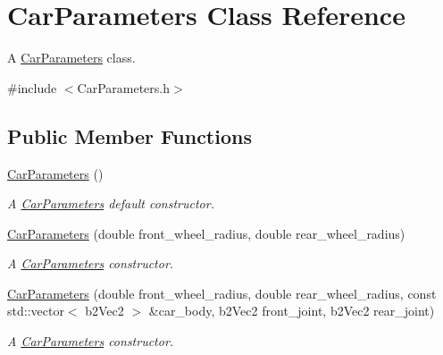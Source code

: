 \hypertarget{classCarParameters}{}\section{Car\+Parameters Class Reference}
\label{classCarParameters}


A \hyperlink{classCarParameters}{Car\+Parameters} class.  




{\ttfamily \#include $<$Car\+Parameters.\+h$>$}

\subsection*{Public Member Functions}
\begin{DoxyCompactItemize}
\item 
\hyperlink{classCarParameters_a188ab05105e5d379744f2fec14d51650}{Car\+Parameters} ()
\begin{DoxyCompactList}\small\item\em A \hyperlink{classCarParameters}{Car\+Parameters} default constructor. \end{DoxyCompactList}\item 
\hyperlink{classCarParameters_a6e3073a201221f3fa524eafb6d0e793d}{Car\+Parameters} (double front\+\_\+wheel\+\_\+radius, double rear\+\_\+wheel\+\_\+radius)
\begin{DoxyCompactList}\small\item\em A \hyperlink{classCarParameters}{Car\+Parameters} constructor. \end{DoxyCompactList}\item 
\hyperlink{classCarParameters_ae6c1ad622bffec4176ef45456e8aaacc}{Car\+Parameters} (double front\+\_\+wheel\+\_\+radius, double rear\+\_\+wheel\+\_\+radius, const std\+::vector$<$ b2\+Vec2 $>$ \&car\+\_\+body, b2\+Vec2 front\+\_\+joint, b2\+Vec2 rear\+\_\+joint)
\begin{DoxyCompactList}\small\item\em A \hyperlink{classCarParameters}{Car\+Parameters} constructor. \end{DoxyCompactList}\end{DoxyCompactItemize}
